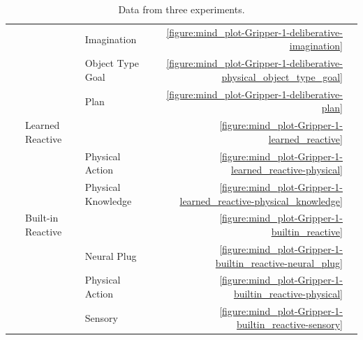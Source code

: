 \begin{table}
\begin{tabular}{lllrr}
    ~         &                   & Imagination        & \autoref{figure:mind_plot-Gripper-1-deliberative-imagination}               & \pageref{figure:mind_plot-Gripper-1-deliberative-imagination} \\
    ~         &                   & Object Type Goal   & \autoref{figure:mind_plot-Gripper-1-deliberative-physical_object_type_goal} & \pageref{figure:mind_plot-Gripper-1-deliberative-physical_object_type_goal} \\
    ~         &                   & Plan               & \autoref{figure:mind_plot-Gripper-1-deliberative-plan}                      & \pageref{figure:mind_plot-Gripper-1-deliberative-plan} \\
    ~         & Learned Reactive  &                    & \autoref{figure:mind_plot-Gripper-1-learned_reactive}                       & \pageref{figure:mind_plot-Gripper-1-learned_reactive} \\
    ~         &                   & Physical Action    & \autoref{figure:mind_plot-Gripper-1-learned_reactive-physical}              & \pageref{figure:mind_plot-Gripper-1-learned_reactive-physical} \\
    ~         &                   & Physical Knowledge & \autoref{figure:mind_plot-Gripper-1-learned_reactive-physical_knowledge}    & \pageref{figure:mind_plot-Gripper-1-learned_reactive-physical_knowledge} \\
    ~         & Built-in Reactive &                    & \autoref{figure:mind_plot-Gripper-1-builtin_reactive}                       & \pageref{figure:mind_plot-Gripper-1-builtin_reactive} \\
    ~         &                   & Neural Plug        & \autoref{figure:mind_plot-Gripper-1-builtin_reactive-neural_plug}           & \pageref{figure:mind_plot-Gripper-1-builtin_reactive-neural_plug} \\
    ~         &                   & Physical Action    & \autoref{figure:mind_plot-Gripper-1-builtin_reactive-physical}              & \pageref{figure:mind_plot-Gripper-1-builtin_reactive-physical} \\
    ~         &                   & Sensory            & \autoref{figure:mind_plot-Gripper-1-builtin_reactive-sensory}               & \pageref{figure:mind_plot-Gripper-1-builtin_reactive-sensory} \\
  \end{tabular}
  \caption[Data from three experiments.]{Data from three experiments.}
  \label{table:experiment_data}
\end{table}

